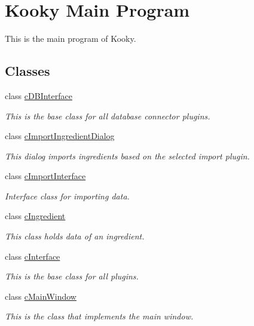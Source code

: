 \hypertarget{group___k_o_o_k_y}{}\section{Kooky Main Program}
\label{group___k_o_o_k_y}


This is the main program of Kooky.  


\subsection*{Classes}
\begin{DoxyCompactItemize}
\item 
class \hyperlink{classc_d_b_interface}{c\+D\+B\+Interface}
\begin{DoxyCompactList}\small\item\em This is the base class for all database connector plugins. \end{DoxyCompactList}\item 
class \hyperlink{classc_import_ingredient_dialog}{c\+Import\+Ingredient\+Dialog}
\begin{DoxyCompactList}\small\item\em This dialog imports ingredients based on the selected import plugin. \end{DoxyCompactList}\item 
class \hyperlink{classc_import_interface}{c\+Import\+Interface}
\begin{DoxyCompactList}\small\item\em Interface class for importing data. \end{DoxyCompactList}\item 
class \hyperlink{classc_ingredient}{c\+Ingredient}
\begin{DoxyCompactList}\small\item\em This class holds data of an ingredient. \end{DoxyCompactList}\item 
class \hyperlink{classc_interface}{c\+Interface}
\begin{DoxyCompactList}\small\item\em This is the base class for all plugins. \end{DoxyCompactList}\item 
class \hyperlink{classc_main_window}{c\+Main\+Window}
\begin{DoxyCompactList}\small\item\em This is the class that implements the main window. \end{DoxyCompactList}\item 

\end{DoxyCompactItemize}
